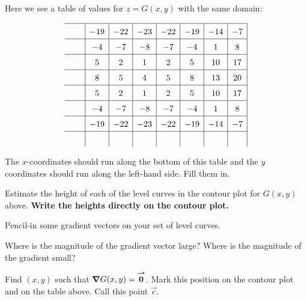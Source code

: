 \documentclass[handout,noauthor,nooutcomes]{ximera}
\begin{document}
\begin{problem}
Here we see a table of values for $z= G(x,y)$ with the same domain:

\[
\renewcommand*{\arraystretch}{1.5}
\begin{array}{c|c|c|c|c|c|c|c|}\hline
\rule{.5cm}{0cm}& -19 & -22 & -23 & -22 & -19 & -14 & -7 \\\hline
& -4 & -7 & -8 & -7 & -4 & 1 & 8 \\\hline
& 5 & 2 & 1 & 2 & 5 & 10 & 17 \\\hline
& 8 & 5 & 4 & 5 & 8 & 13 & 20 \\\hline
& 5 & 2 & 1 & 2 & 5 & 10 & 17 \\\hline
& -4 & -7 & -8 & -7 & -4 & 1 & 8 \\\hline
& -19 & -22 & -23 & -22 & -19 & -14 & -7 \\\hline
  &    &    &    &    &   &    & 
\end{array}
\]

The $x$-coordinates should run along the bottom of this table and the
$y$ coordinates should run along the left-hand side. Fill them in.
\end{problem}

\begin{problem}
Estimate the height of each of the level curves in the contour plot
for $G(x,y)$ above. \textbf{Write the heights directly on the contour
  plot.}
\end{problem}

\begin{problem}
  Pencil-in some gradient vectors on your set of level curves. 
\end{problem}


\begin{problem}
  Where is the magnitude of the gradient vector large? Where is the
  magnitude of the gradient small?
\end{problem}


\begin{problem}
Find $(x,y)$ such that $\boldsymbol\nabla G(x,y) = {\overset{\boldsymbol{\rightharpoonup}}{\mathbf{0}}}$. Mark this position on the
contour plot and on the table above. Call this point $\vec{c}$.
\end{problem}









\end{document}
